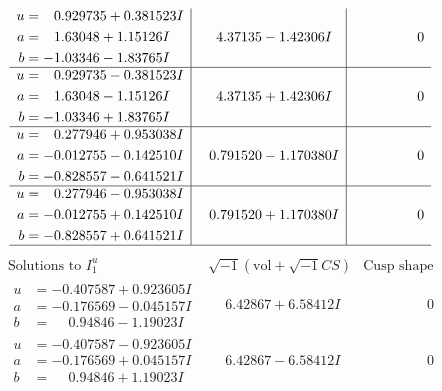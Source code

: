 \documentclass[1p]{elsarticle_modified}
\theoremstyle{definition}
\newcommand{\I}{\sqrt{-1}}
\begin{document}
$$\begin{array}{c|c|c}
\begin{aligned}
u &= \phantom{-}0.929735 + 0.381523 I \\
a &= \phantom{-}1.63048 + 1.15126 I \\
b &= -1.03346 - 1.83765 I\end{aligned}
 & \phantom{-}4.37135 - 1.42306 I & \phantom{-0.000000 } 0 \\ \hline\begin{aligned}
u &= \phantom{-}0.929735 - 0.381523 I \\
a &= \phantom{-}1.63048 - 1.15126 I \\
b &= -1.03346 + 1.83765 I\end{aligned}
 & \phantom{-}4.37135 + 1.42306 I & \phantom{-0.000000 } 0 \\ \hline\begin{aligned}
u &= \phantom{-}0.277946 + 0.953038 I \\
a &= -0.012755 - 0.142510 I \\
b &= -0.828557 - 0.641521 I\end{aligned}
 & \phantom{-}0.791520 - 1.170380 I & \phantom{-0.000000 } 0 \\ \hline\begin{aligned}
u &= \phantom{-}0.277946 - 0.953038 I \\
a &= -0.012755 + 0.142510 I \\
b &= -0.828557 + 0.641521 I\end{aligned}
 & \phantom{-}0.791520 + 1.170380 I & \phantom{-0.000000 } 0\\
 \hline 
 \end{array}$$\newpage$$\begin{array}{c|c|c}  
\text{Solutions to }I^u_{1}& \I (\text{vol} + \sqrt{-1}CS) & \text{Cusp shape}\\
 \hline 
\begin{aligned}
u &= -0.407587 + 0.923605 I \\
a &= -0.176569 - 0.045157 I \\
b &= \phantom{-}0.94846 - 1.19023 I\end{aligned}
 & \phantom{-}6.42867 + 6.58412 I & \phantom{-0.000000 } 0 \\ \hline\begin{aligned}
u &= -0.407587 - 0.923605 I \\
a &= -0.176569 + 0.045157 I \\
b &= \phantom{-}0.94846 + 1.19023 I\end{aligned}
 & \phantom{-}6.42867 - 6.58412 I & \phantom{-0.000000 } 0 \\ \hline\begin{aligned}

\end{aligned}
\end{array}$$
\end{document}
